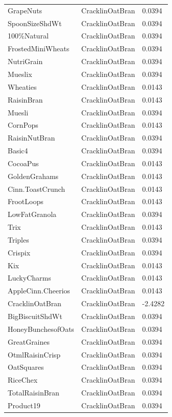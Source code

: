 \begin{table}[!htbp]
\begin{tabular}{lll}
GrapeNuts & CracklinOatBran & 0.0394
\\
SpoonSizeShdWt & CracklinOatBran & 0.0394
\\
100\%Natural & CracklinOatBran & 0.0394
\\
FrostedMiniWheats & CracklinOatBran & 0.0394
\\
NutriGrain & CracklinOatBran & 0.0394
\\
Mueslix & CracklinOatBran & 0.0394
\\
Wheaties & CracklinOatBran & 0.0143
\\
RaisinBran & CracklinOatBran & 0.0143
\\
Muesli & CracklinOatBran & 0.0394
\\
CornPops & CracklinOatBran & 0.0143
\\
RaisinNutBran & CracklinOatBran & 0.0394
\\
Basic4 & CracklinOatBran & 0.0394
\\
CocoaPus & CracklinOatBran & 0.0143
\\
GoldenGrahams & CracklinOatBran & 0.0143
\\
Cinn.ToastCrunch & CracklinOatBran & 0.0143
\\
FrootLoops & CracklinOatBran & 0.0143
\\
LowFatGranola & CracklinOatBran & 0.0394
\\
Trix & CracklinOatBran & 0.0143
\\
Triples & CracklinOatBran & 0.0394
\\
Crispix & CracklinOatBran & 0.0394
\\
Kix & CracklinOatBran & 0.0143
\\
LuckyCharms & CracklinOatBran & 0.0143
\\
AppleCinn.Cheerios & CracklinOatBran & 0.0143
\\
CracklinOatBran & CracklinOatBran & -2.4282
\\
BigBiscuitShdWt & CracklinOatBran & 0.0394
\\
HoneyBunchesofOats & CracklinOatBran & 0.0394
\\
GreatGraines & CracklinOatBran & 0.0394
\\
OtmlRaisinCrisp & CracklinOatBran & 0.0394
\\
OatSquares & CracklinOatBran & 0.0394
\\
RiceChex & CracklinOatBran & 0.0394
\\
TotalRaisinBran & CracklinOatBran & 0.0394
\\
Product19 & CracklinOatBran & 0.0394
\\

\end{tabular}
\end{table}
